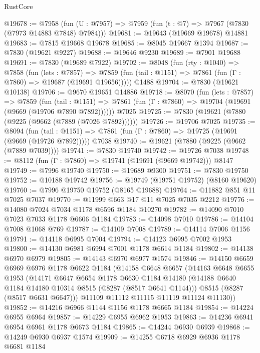 \begin{lexlean}{RustCore}
\begin{coremodule}
@19678 := @7958
    (fun (U : @7957) => @7959 (fun (t : @7) => @7967 (@7830 (@7973 @14883 @7848) @7984)))
@19681 := @19643 (@19669 @19678) @14881
@19683 := @7815 @19668 @19678
@19685 := @8045 @19667 @1394
@19687 := @7830 (@19621 @9227)
@19688 := @19646 @9230
@19689 := @7901 @19688
@19691 := @7830 (@19689 @7922)
@19702 := @8048
    (fun (rty : @1040) =>
    @7858
      (fun (lets : @7857) =>
      @7859 (fun (tail : @1151) => @7861 (fun (Γ : @7860) => @19687 (@19691 @19656)))))
    @1488
@19704 := @7830 (@19621 @10138)
@19706 := @9670 @19651 @14886
@19718 := @8070
    (fun (lets : @7857) =>
    @7859
      (fun (tail : @1151) =>
      @7861 (fun (Γ : @7860) => @19704 (@19691 (@9669 (@19706 @7890 @7892))))))
    @7025
@19725 := @7830 (@19621 (@7880 (@9225 (@9662 (@7889 (@7026 @7892))))))
@19726 := @19706 @7025
@19735 := @8094
    (fun (tail : @1151) => @7861 (fun (Γ : @7860) => @19725 (@19691 (@9669 (@19726 @7892)))))
    @7038
@19740 := @19621 (@7880 (@9225 (@9662 (@7889 @7039))))
@19741 := @7830 @19740
@19742 := @19726 @7038
@19748 := @8112 (fun (Γ : @7860) => @19741 (@19691 (@9669 @19742))) @8147
@19749 := @7996 @19740
@19750 := @19689 @9300
@19751 := @7830 @19750
@19752 := @10188 @19742
@19756 := @19749 (@19751 @19752) (@8160 @19620)
@19760 := @7996 @19750 @19752 (@8165 @19688)
@19764 := @11882 @851 @11 @7025 @7037
@19770 := @11999 @663 @17 @11 @7025 @7035 @2212
@19776 := @14080 @7024 @7034 @1178 @6596 @1184 @10270
@19782 := @14090 @7010 @7023 @7033 @1178 @6606 @1184
@19783 := @14098 @7010
@19786 := @14104 @7008 @1068 @769
@19787 := @14109 @7008
@19789 := @14114 @7006 @1156
@19791 := @14118 @6995 @7004
@19794 := @14123 @6995 @7002 @1953
@19800 := @14130 @6981 @6994 @7001 @1178 @6614 @1184
@19802 := @14138 @6970 @6979
@19805 := @14143 @6970 @6977 @1574
@19846 := @14150
    @6659
    @6969
    @6976
    @1178
    @6622
    @1184
    (@14158
      @6648
      @6657
      (@14163
        @6648
        @6655
        @1953
        (@14171
          @6647
          @6654
          @1178
          @6630
          @1184
          @14180
          (@14188 @6640 @1184 @14180 @10314 @8515 (@8287 (@8517 @6641 @1144)))
          @8515
          (@8287 (@8517 @6631 @6647)))
        @11109
        @11112
        @11115
        @11119
        @11124
        @11130))
@19852 := @14216 @6966 @1144 @1156 @1178 @6665 @1184
@19854 := @14224 @6955 @6964
@19857 := @14229 @6955 @6962 @1953
@19863 := @14236 @6941 @6954 @6961 @1178 @6673 @1184
@19865 := @14244 @6930 @6939
@19868 := @14249 @6930 @6937 @1574
@19909 := @14255
    @6718
    @6929
    @6936
    @1178
    @6681
    @1184

\end{coremodule}
\end{lexlean}
